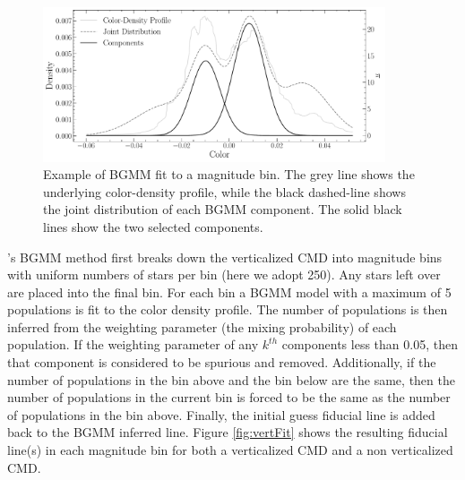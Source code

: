 \begin{figure}
	\centering
	\includegraphics[width=0.9\textwidth]{figures/ngc2808/BGMMMixingBin.pdf}
	\caption{Example of BGMM fit to a magnitude bin. The grey line shows the
	underlying color-density profile, while the black dashed-line shows the
	joint distribution of each BGMM component. The solid black lines show the
	two selected components.}
	\label{fig:BGMMDist}
\end{figure}

\fidanka's BGMM method first breaks down the verticalized CMD into magnitude
bins with uniform numbers of stars per bin (here we adopt 250). Any stars left
over are placed into the final bin. For each bin a BGMM model with a maximum of
5 populations is fit to the color density profile. The number of populations is
then inferred from the weighting parameter (the mixing probability) of each
population. If the weighting parameter of any $k^{th}$ components less than
{\color{blue}0.05}, then that component is considered to be spurious and
removed. Additionally, if the number of populations in the bin above and the
bin below are the same, then the number of populations in the current bin is
forced to be the same as the number of populations in the bin above. Finally,
the initial guess fiducial line is added back to the BGMM inferred line. Figure
\ref{fig:vertFit} shows the resulting fiducial line(s) in each magnitude bin
for both a verticalized CMD and a non verticalized CMD.

